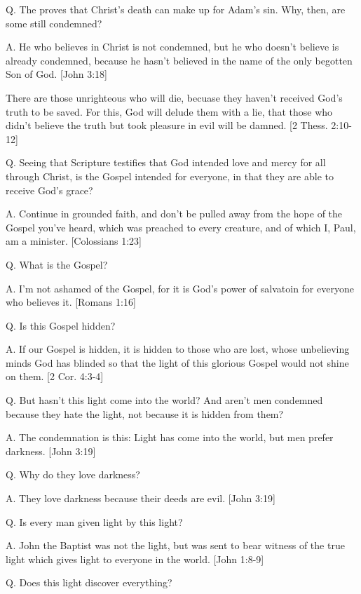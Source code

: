 \documentclass[../main.tex]{subfiles}
\begin{document}
	Q. The proves that Christ's death can make up for Adam's sin. Why, then, are some still condemned?

	A. He who believes in Christ is not condemned, but he who doesn't believe is already condemned, because he hasn't believed in the name of the only begotten Son of God. [John 3:18]

	There are those unrighteous who will die, becuase they haven't received God's truth to be saved. For this, God will delude them with a lie, that those who didn't believe the truth but took pleasure in evil will be damned. [2 Thess. 2:10-12]

	Q. Seeing that Scripture testifies that God intended love and mercy for all through Christ, is the Gospel intended for everyone, in that they are able to receive God's grace?

	A. Continue in grounded faith, and don't be pulled away from the hope of the Gospel you've heard, which was preached to every creature, and of which I, Paul, am a minister. [Colossians 1:23]

	Q. What is the Gospel?

	A. I'm not ashamed of the Gospel, for it is God's power of salvatoin for everyone who believes it. [Romans 1:16]

	Q. Is this Gospel hidden?

	A. If our Gospel is hidden, it is hidden to those who are lost, whose unbelieving minds God has blinded so that the light of this glorious Gospel would not shine on them. [2 Cor. 4:3-4]

	Q. But hasn't this light come into the world? And aren't men condemned because they hate the light, not because it is hidden from them?

	A. The condemnation is this: Light has come into the world, but men prefer darkness. [John 3:19]

	Q. Why do they love darkness?

	A. They love darkness because their deeds are evil. [John 3:19]

	Q. Is every man given light by this light?

	A. John the Baptist was not the light, but was sent to bear witness of the true light which gives light to everyone in the world. [John 1:8-9]

	Q. Does this light discover everything?
\end{document}
